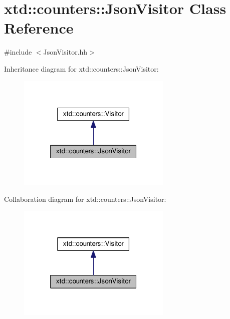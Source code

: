 \hypertarget{classxtd_1_1counters_1_1JsonVisitor}{}\section{xtd\+:\+:counters\+:\+:Json\+Visitor Class Reference}
\label{classxtd_1_1counters_1_1JsonVisitor}


{\ttfamily \#include $<$Json\+Visitor.\+hh$>$}



Inheritance diagram for xtd\+:\+:counters\+:\+:Json\+Visitor\+:
\nopagebreak
\begin{figure}[H]
\begin{center}
\leavevmode
\includegraphics[width=208pt]{classxtd_1_1counters_1_1JsonVisitor__inherit__graph}
\end{center}
\end{figure}


Collaboration diagram for xtd\+:\+:counters\+:\+:Json\+Visitor\+:
\nopagebreak
\begin{figure}[H]
\begin{center}
\leavevmode
\includegraphics[width=208pt]{classxtd_1_1counters_1_1JsonVisitor__coll__graph}
\end{center}
\end{figure}
